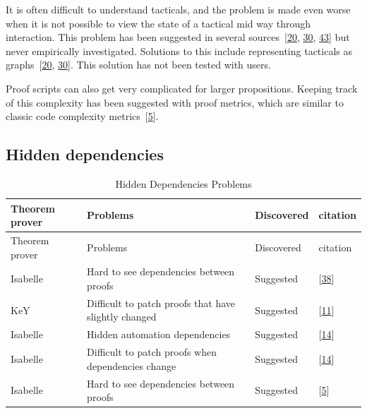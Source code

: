 \documentclass[
]{article}
\begin{document}
It is often difficult to understand tacticals, and the problem is made
even worse when it is not possible to view the state of a tactical mid
way through interaction. This problem has been suggested in several
sources~{[}\protect\hyperlink{ref-grov_tinker_2018}{20},
\protect\hyperlink{ref-lin_understanding_2016}{30},
\protect\hyperlink{ref-zacchiroli_user_2007}{43}{]} but never
empirically investigated. Solutions to this include representing
tacticals as graphs~{[}\protect\hyperlink{ref-grov_tinker_2018}{20},
\protect\hyperlink{ref-lin_understanding_2016}{30}{]}. This solution has
not been tested with users.

Proof scripts can also get very complicated for larger propositions.
Keeping track of this complexity has been suggested with proof metrics,
which are similar to classic code complexity
metrics~{[}\protect\hyperlink{ref-aspinall_towards_2016}{5}{]}.

\hypertarget{hidden-dependencies-1}{%
\subsection{Hidden dependencies}\label{hidden-dependencies-1}}

\hypertarget{tbl:hidden_dependencies}{}
\begin{longtable}[]{@{}llll@{}}
\caption{\label{tbl:hidden_dependencies}Hidden Dependencies
Problems}\tabularnewline
\toprule
Theorem prover & Problems & Discovered & citation \\
\midrule
\endfirsthead
\toprule
Theorem prover & Problems & Discovered & citation \\
\midrule
\endhead
Isabelle & Hard to see dependencies between proofs & Suggested &
{[}\protect\hyperlink{ref-spichkova_human-centred_2017}{38}{]} \\
KeY & Difficult to patch proofs that have slightly changed & Suggested &
{[}\protect\hyperlink{ref-beckert_evaluating_2012}{11}{]} \\
Isabelle & Hidden automation dependencies & Suggested &
{[}\protect\hyperlink{ref-bourke_challenges_2012}{14}{]} \\
Isabelle & Difficult to patch proofs when dependencies change &
Suggested & {[}\protect\hyperlink{ref-bourke_challenges_2012}{14}{]} \\
Isabelle & Hard to see dependencies between proofs & Suggested &
{[}\protect\hyperlink{ref-aspinall_towards_2016}{5}{]} \\
\bottomrule
\end{longtable}
\end{document}
